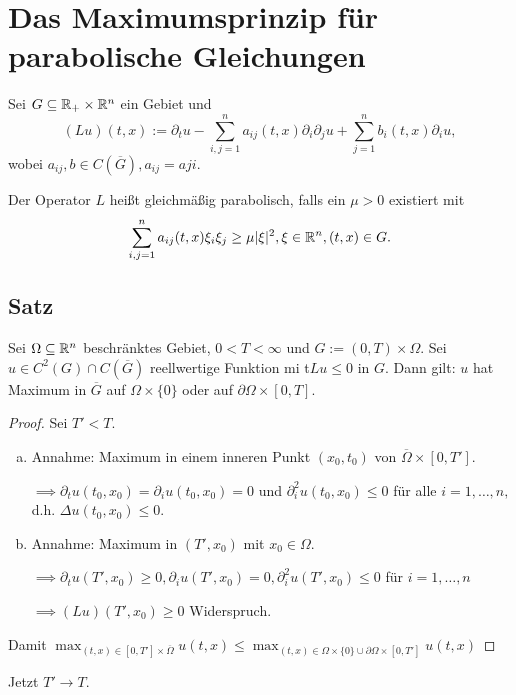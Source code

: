 \section{Das Maximumsprinzip für parabolische Gleichungen}

Sei $G \subseteq \mathbb{R}_+ \times \mathbb{R}^n$ ein Gebiet und
$$
(Lu)(t,x) := \partial_t u - \sum_{i, j = 1}^n a_{ij}(t,x) \partial_i \partial_j u + \sum_{j = 1}^n b_i(t,x) \partial_i u,
$$
wobei $a_{ij}, b \in C(\overline G), a_{ij} = a{ji}$.

Der Operator $L$ heißt gleichmäßig parabolisch, falls ein $\mu > 0$ existiert mit
$$
\sum_{i,j = 1}^n a_{ij}(t,x) \xi_i \xi_j \geq \mu |\xi|^2, \xi \in \mathbb{R}^n, (t,x) \in G.
$$

\subsection{Satz}

Sei $\Omega \subseteq \mathbb{R}^n$ beschränktes Gebiet, $0 < T < \infty$  und $G := (0, T) \times \Omega$. Sei $u \in C^2(G) \cap C(\overline G)$ reellwertige Funktion mi t$Lu \leq 0$ in $G$.
Dann gilt: $u$ hat Maximum in $\overline G$ auf $\Omega \times \{0\}$ oder auf $\partial \Omega \times [0,T]$.

\begin{proof}
  Sei $T' < T$.

  \begin{enumerate}[a)]
    \item Annahme: Maximum in einem inneren Punkt $(x_0, t_0)$ von $\overline \Omega \times [0,T']$.

      $\implies \partial_t u(t_0, x_0) = \partial_i u(t_0, x_0) = 0$ und $\partial_i^2 u(t_0, x_0) \leq 0$ für alle $i = 1, \dots, n, $ d.h. $\Delta u(t_0, x_0) \leq 0$.

    \item Annahme: Maximum in $(T', x_0)$ mit $x_0 \in \Omega$.

      $\implies \partial_t u(T', x_0) \geq 0, \partial_i u(T', x_0) = 0, \partial_i^2 u(T', x_0) \leq 0$ für $i = 1, \dots, n$

      $\implies (Lu)(T', x_0) \geq 0$ Widerspruch. 
  \end{enumerate}

  Damit $\max_{(t,x) \in [0,T'] \times \overline \Omega} u(t,x) \leq \max_{(t,x) \in \Omega \times \{0\} \cup \partial \Omega \times [0, T']} u(t,x)$
\end{proof}

Jetzt $T' \to T$.

